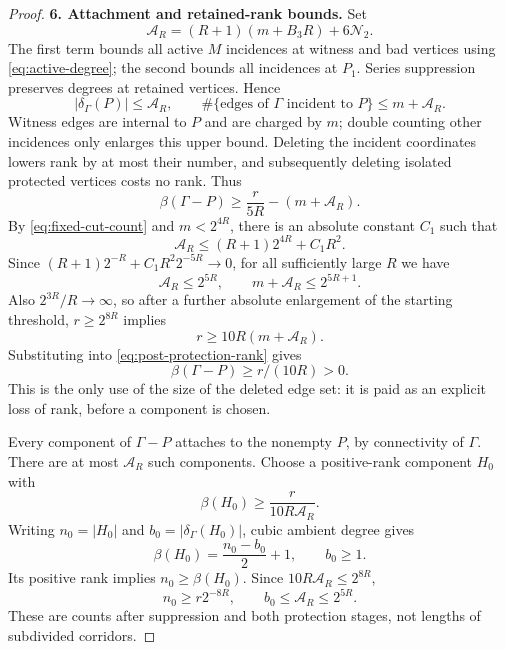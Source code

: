 \documentclass[11pt,a4paper]{article}
\numberwithin{equation}{section}
\theoremstyle{definition}
\theoremstyle{remark}
\newcommand{\proofstep}[1]{\par\addvspace{\medskipamount}\noindent\textbf{#1}\enspace\ignorespaces}
\begin{document}
\begin{proof}
\proofstep{6. Attachment and retained-rank bounds.}
Set
\begin{equation}\label{eq:AR}
 \mathcal A_R=(R+1)(m+B_3R)+6\mathcal N_2.
\end{equation}
The first term bounds all active $M$ incidences at witness and bad vertices using \eqref{eq:active-degree}; the second bounds all incidences at $P_1$. Series suppression preserves degrees at retained vertices. Hence
\[
 |\delta_\Gamma(P)|\le \mathcal A_R,
 \qquad \#\{\text{edges of }\Gamma\text{ incident to }P\}\le m+\mathcal A_R.
\]
Witness edges are internal to $P$ and are charged by $m$; double counting other incidences only enlarges this upper bound. Deleting the incident coordinates lowers rank by at most their number, and subsequently deleting isolated protected vertices costs no rank. Thus
\begin{equation}\label{eq:post-protection-rank}
 \beta(\Gamma-P)\ge\frac{r}{5R}-(m+\mathcal A_R).
\end{equation}
By \eqref{eq:fixed-cut-count} and $m<2^{4R}$, there is an absolute constant $C_1$ such that
\[
 \mathcal A_R\le(R+1)2^{4R}+C_1R^2.
\]
Since $(R+1)2^{-R}+C_1R^2 2^{-5R}\to0$, for all sufficiently large $R$ we have
\begin{equation}\label{eq:AR-bound}
 \mathcal A_R\le2^{5R},\qquad
 m+\mathcal A_R\le2^{5R+1}.
\end{equation}
Also $2^{3R}/R\to\infty$, so after a further absolute enlargement of the starting threshold, $r\ge2^{8R}$ implies
\[
 r\ge10R(m+\mathcal A_R).
\]
Substituting into \eqref{eq:post-protection-rank} gives
\[
 \beta(\Gamma-P)\ge r/(10R)>0.
\]
This is the only use of the size of the deleted edge set: it is paid as an explicit loss of rank, before a component is chosen.

Every component of $\Gamma-P$ attaches to the nonempty $P$, by connectivity of $\Gamma$. There are at most $\mathcal A_R$ such components. Choose a positive-rank component $H_0$ with
\[
 \beta(H_0)\ge\frac{r}{10R\mathcal A_R}.
\]
Writing $n_0=|H_0|$ and $b_0=|\delta_\Gamma(H_0)|$, cubic ambient degree gives
\[
 \beta(H_0)=\frac{n_0-b_0}{2}+1,\qquad b_0\ge1.
\]
Its positive rank implies $n_0\ge\beta(H_0)$. Since $10R\mathcal A_R\le2^{8R}$,
\begin{equation}\label{eq:root-order}
 n_0\ge r2^{-8R},\qquad b_0\le \mathcal A_R\le2^{5R}.
\end{equation}
These are counts after suppression and both protection stages, not lengths of subdivided corridors.


\end{proof}
\end{document}
